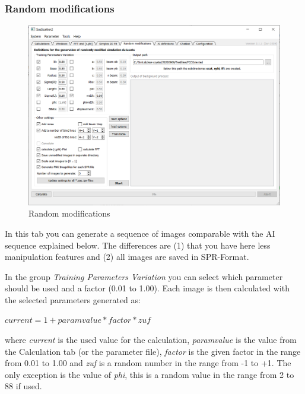 \documentclass[11pt]{article} %
\begin{document}
\clearpage
\subsubsection{Random modifications}
\begin{figure}[H]
 \centering
 \includegraphics[width=\textwidth]{gui-tpv.png}
 \caption{Random modifications}
\end{figure}

In this tab you can generate a sequence of images comparable with the AI sequence explained below. The differences are (1) that you have here less manipulation features and (2) all images are saved in SPR-Format.

In the group {\it Training Parameters Variation} you can select which parameter should be used and a factor (0.01 to 1.00). Each image is then calculated with the selected parameters generated as: \\
\centerline{$current = 1 + paramvalue * factor * zuf$}
where {\it current} is the used value for the calculation, {\it paramvalue} is the value from the Calculation tab (or the parameter file), {\it factor} is the given factor in the range from 0.01 to 1.00 and {\it zuf} is a random number in the range from -1 to +1. The only exception is the value of {\it phi}, this is a random value in the range from 2 to 88 if used.
\end{document}

